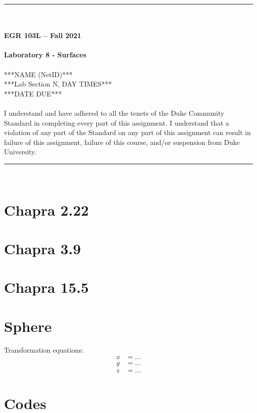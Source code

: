\documentclass{article}
\begin{document}
\begin{center}
\rule{6.5in}{0.5mm}\\~\\
\textbf{\large EGR 103L -- Fall 2021}\\~\\
\textbf{\huge Laboratory 8 - Surfaces}\\~\\
***NAME (NetID)***\\
***Lab Section N, DAY TIMES***\\
***DATE DUE***\\~\\
{\small I understand and have adhered to all the tenets of the Duke Community Standard in completing every part of this assignment.  I understand that a violation of any part of the Standard on any part of this assignment can result in failure of this assignment, failure of this course, and/or suspension from Duke University.} 
\rule{6.5in}{0.5mm}\\
\end{center}
\tableofcontents
\listoffigures
\renewcommand{\arraystretch}{1.5}
\clearpage

\section{Chapra 2.22}

\section{Chapra 3.9}

\section{Chapra 15.5}

\section{Sphere}
Transformation equations:
\begin{align*}
x&=...\\
y&=...\\
z&=...
\end{align*}
\pagebreak

\appendix
\section{Codes}
\end{document}
